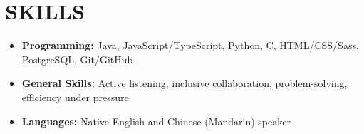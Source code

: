 \documentclass[letterpaper,10pt]{extarticle}
\begin{document}
\section*{SKILLS}
\begin{itemize}
    \item \textbf{Programming:} Java, JavaScript/TypeScript, Python, C, HTML/CSS/Sass, PostgreSQL, Git/GitHub
    \item \textbf{General Skills:} Active listening, inclusive collaboration, problem-solving, efficiency under pressure
    \item \textbf{Languages:} Native English and Chinese (Mandarin) speaker
\end{itemize}

\end{document}
